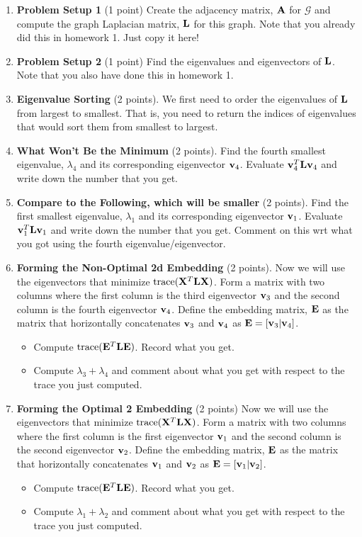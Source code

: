 \documentclass{article}
\begin{document}
\begin{enumerate}
\item {\bf Problem Setup 1} (1 point) Create the adjacency matrix, ${\bf A}$ for $\mathcal{G}$ and compute the graph Laplacian matrix, ${\bf L}$ for this graph. Note that you already did this in homework 1. Just copy it here! 
\item {\bf Problem Setup 2} (1 point) Find the eigenvalues and eigenvectors of ${\bf L}$. Note that you also have done this in homework 1. 
\item {\bf Eigenvalue Sorting} (2 points). We first need to order the eigenvalues of ${\bf L}$ from largest to smallest. That is, you need to return the indices of eigenvalues that would sort them from smallest to largest. 
\item {\bf What Won't Be the Minimum} (2 points). Find the fourth smallest eigenvalue, ${\lambda}_{4}$ and its corresponding eigenvector ${\bf v}_{4}$. Evaluate ${\bf v}_{4}^{T}{\bf L}{\bf v}_{4}$ and write down the number that you get. 
\item {\bf Compare to the Following, which will be smaller} (2 points). Find the first smallest eigenvalue, ${\lambda}_{1}$ and its corresponding eigenvector ${\bf v}_{1}$. Evaluate ${\bf v}_{1}^{T}{\bf L}{\bf v}_{1}$ and write down the number that you get. Comment on this wrt what you got using the fourth eigenvalue/eigenvector. 
\item {\bf Forming the Non-Optimal 2d Embedding} (2 points). Now we will use the eigenvectors that minimize $\text{trace}({\bf X}^{T}{\bf L}{\bf X})$. Form a matrix with two columns where the first column is the third eigenvector ${\bf v}_{3}$ and the second column is the fourth eigenvector ${\bf v}_{4}$. Define the embedding matrix, ${\bf E}$ as the matrix that horizontally concatenates ${\bf v}_{3}$ and ${\bf v}_{4}$ as ${\bf E}=[{\bf v}_{3} | {\bf v}_{4}]$. 
\begin{itemize}
\item Compute $\text{trace}({\bf E}^{T}{\bf L}{\bf E})$. Record what you get.
\item Compute $\lambda_{3}+\lambda_{4}$ and comment about what you get with respect to the trace you just computed. 
\end{itemize}
\item {\bf Forming the Optimal 2 Embedding} (2 points) Now we will use the eigenvectors that minimize $\text{trace}({\bf X}^{T}{\bf L}{\bf X})$. Form a matrix with two columns where the first column is the first eigenvector ${\bf v}_{1}$ and the second column is the second eigenvector ${\bf v}_{2}$. Define the embedding matrix, ${\bf E}$ as the matrix that horizontally concatenates ${\bf v}_{1}$ and ${\bf v}_{2}$ as ${\bf E}=[{\bf v}_{1} | {\bf v}_{2}]$. 
\begin{itemize}
\item Compute $\text{trace}({\bf E}^{T}{\bf L}{\bf E})$. Record what you get.
\item Compute $\lambda_{1}+\lambda_{2}$ and comment about what you get with respect to the trace you just computed. 
\end{itemize}

\end{enumerate}
\end{document}
